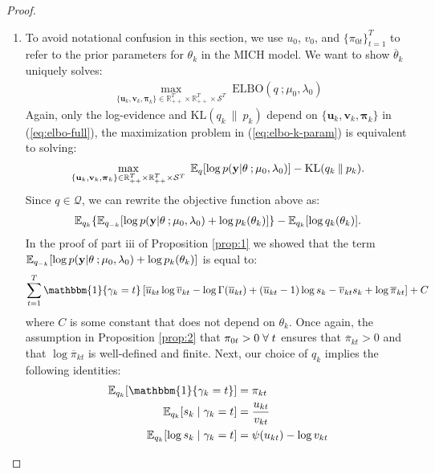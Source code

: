 \begin{proof}
\begin{enumerate}[label=\roman*.]
\item To avoid notational confusion in this section, we use $u_0$, $v_0$, and $\{\pi_{0t}\}_{t=1}^T$ to refer to the prior parameters for $\theta_k$ in the MICH model. We want to show $\overline{\theta}_k$ uniquely solves: 
\begin{align}
    \max_{\{\mathbf{u}_k, \mathbf{v}_k, \boldsymbol{\pi}_k\} \in \mathbb{R}_{++}^T\times\mathbb{R}_{++}^T \times\mathcal{S}^T} \;  \text{ELBO}(q\:;\mu_0,\lambda_0) \label{eq:elbo-k-param}
\end{align}
Again, only the log-evidence and $\text{KL}(q_k\:\lVert\: p_k)$ depend on $\{\mathbf{u}_k, \mathbf{v}_k, \boldsymbol{\pi}_k\}$ in (\ref{eq:elbo-full}), the maximization problem in (\ref{eq:elbo-k-param}) is equivalent to solving: 
\begin{align*}
    \max_{\{\mathbf{u}_k, \mathbf{v}_k, \boldsymbol{\pi}_k\} \in \mathbb{R}_{++}^T\times\mathbb{R}_{++}^T \times\mathcal{S}^T} \;  \mathbb{E}_q[\log p(\mathbf{y}| \theta\:; \mu_0,\lambda_0)] - \text{KL}(q_k\:\lVert\: p_k).
\end{align*}
Since $q \in \mathcal{Q}$, we can rewrite the objective function above as:
\begin{align*}
    \mathbb{E}_{q_k}\{\mathbb{E}_{q_{-k}}[\log p(\mathbf{y}| \theta\:; \mu_0,\lambda_0)+\log p_k(\theta_k)]\} - \mathbb{E}_{q_k}[\log q_k(\theta_k)].
\end{align*}
In the proof of part iii of Proposition \ref{prop:1} we showed that the term $\mathbb{E}_{q_{-k}}[\log p(\mathbf{y}| \theta\:; \mu_0,\lambda_0)+\log p_k(\theta_k)]$ is equal to:
\begin{align*}
     \sum_{t=1}^T \mathbbm{1}\{\gamma_k = t\}\left[ \overline{u}_{kt} \log \overline{v}_{kt} -  \log\Gamma(\overline{u}_{kt}) + \left(\overline{u}_{kt} -1\right)\log s_{k}  - \overline{v}_{kt} s_{k} + \log \overline{\pi}_{kt}\right] + C
\end{align*}
where $C$ is some constant that does not depend on $\theta_k$. Once again, the assumption in Proposition \ref{prop:2} that $\pi_{0t} > 0 \;\forall\; t$ ensures that $\overline{\pi}_{kt} > 0$ and that $\log \overline{\pi}_{kt}$ is well-defined and finite. Next, our choice of $q_k$ implies the following identities:
\begin{align*}
    \E_{q_k}[\mathbbm{1}\{\gamma_k = t\}] &= \pi_{kt} \\
    \E_{q_k}[s_{k}\;|\;\gamma_k=t] &= \frac{u_{kt}}{v_{kt}} \\
    \E_{q_k}[\log s_{k}\;|\;\gamma_k=t] &= \psi(u_{kt}) - \log v_{kt}
\end{align*}

\end{enumerate}
\end{proof}
